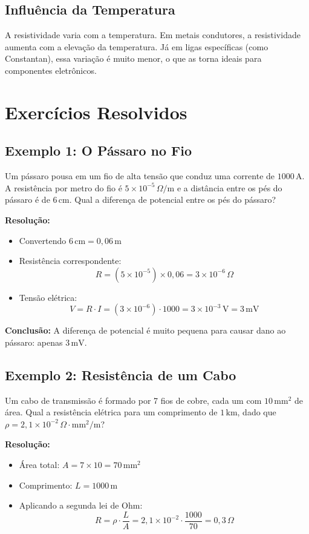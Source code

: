 \subsection{Influência da Temperatura}

A resistividade varia com a temperatura. Em metais condutores, a resistividade aumenta com a elevação da temperatura. Já em ligas específicas (como Constantan), essa variação é muito menor, o que as torna ideais para componentes eletrônicos.

\section{Exercícios Resolvidos}

\subsection*{Exemplo 1: O Pássaro no Fio}
Um pássaro pousa em um fio de alta tensão que conduz uma corrente de $1000\,\text{A}$. A resistência por metro do fio é $5 \times 10^{-5}\,\Omega/\text{m}$ e a distância entre os pés do pássaro é de $6\,\text{cm}$. Qual a diferença de potencial entre os pés do pássaro?

\textbf{Resolução:}
\begin{itemize}
    \item Convertendo $6\,\text{cm} = 0{,}06\,\text{m}$
    \item Resistência correspondente:
    \[
    R = \left(5 \times 10^{-5}\right) \times 0{,}06 = 3 \times 10^{-6}\,\Omega
    \]
    \item Tensão elétrica:
    \[
    V = R \cdot I = \left(3 \times 10^{-6}\right) \cdot 1000 = 3 \times 10^{-3}\,\text{V} = 3\,\text{mV}
    \]
\end{itemize}

\textbf{Conclusão:} A diferença de potencial é muito pequena para causar dano ao pássaro: apenas $3\,\text{mV}$.

\subsection*{Exemplo 2: Resistência de um Cabo}
Um cabo de transmissão é formado por 7 fios de cobre, cada um com $10\,\text{mm}^2$ de área. Qual a resistência elétrica para um comprimento de $1\,\text{km}$, dado que $\rho = 2{,}1 \times 10^{-2}\,\Omega \cdot \text{mm}^2/\text{m}$?

\textbf{Resolução:}
\begin{itemize}
    \item Área total: $A = 7 \times 10 = 70\,\text{mm}^2$
    \item Comprimento: $L = 1000\,\text{m}$
    \item Aplicando a segunda lei de Ohm:
    \[
    R = \rho \cdot \frac{L}{A} = 2{,}1 \times 10^{-2} \cdot \frac{1000}{70} = 0{,}3\,\Omega
    \]
\end{itemize}

